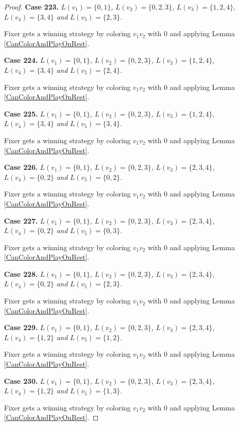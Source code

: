 \documentclass[12pt]{amsart}
\theoremstyle{plain}
\theoremstyle{definition}
\theoremstyle{remark}
\begin{document}
\begin{proof}
\noindent\textbf{Case 223.  }\textit{$L(v_1) = \{0, 1\}$, $L(v_2) = \{0, 2, 3\}$, $L(v_3) = \{1, 2, 4\}$, $L(v_4) = \{3, 4\}$ and $L(v_5) = \{2, 3\}$.}

Fixer gets a winning strategy by coloring $v_1v_2$ with $0$ and applying Lemma \ref{CanColorAndPlayOnRest}.

\noindent\textbf{Case 224.  }\textit{$L(v_1) = \{0, 1\}$, $L(v_2) = \{0, 2, 3\}$, $L(v_3) = \{1, 2, 4\}$, $L(v_4) = \{3, 4\}$ and $L(v_5) = \{2, 4\}$.}

Fixer gets a winning strategy by coloring $v_1v_2$ with $0$ and applying Lemma \ref{CanColorAndPlayOnRest}.

\noindent\textbf{Case 225.  }\textit{$L(v_1) = \{0, 1\}$, $L(v_2) = \{0, 2, 3\}$, $L(v_3) = \{1, 2, 4\}$, $L(v_4) = \{3, 4\}$ and $L(v_5) = \{3, 4\}$.}

Fixer gets a winning strategy by coloring $v_1v_2$ with $0$ and applying Lemma \ref{CanColorAndPlayOnRest}.

\noindent\textbf{Case 226.  }\textit{$L(v_1) = \{0, 1\}$, $L(v_2) = \{0, 2, 3\}$, $L(v_3) = \{2, 3, 4\}$, $L(v_4) = \{0, 2\}$ and $L(v_5) = \{0, 2\}$.}

Fixer gets a winning strategy by coloring $v_1v_2$ with $0$ and applying Lemma \ref{CanColorAndPlayOnRest}.

\noindent\textbf{Case 227.  }\textit{$L(v_1) = \{0, 1\}$, $L(v_2) = \{0, 2, 3\}$, $L(v_3) = \{2, 3, 4\}$, $L(v_4) = \{0, 2\}$ and $L(v_5) = \{0, 3\}$.}

Fixer gets a winning strategy by coloring $v_1v_2$ with $0$ and applying Lemma \ref{CanColorAndPlayOnRest}.

\noindent\textbf{Case 228.  }\textit{$L(v_1) = \{0, 1\}$, $L(v_2) = \{0, 2, 3\}$, $L(v_3) = \{2, 3, 4\}$, $L(v_4) = \{0, 2\}$ and $L(v_5) = \{2, 3\}$.}

Fixer gets a winning strategy by coloring $v_1v_2$ with $0$ and applying Lemma \ref{CanColorAndPlayOnRest}.

\noindent\textbf{Case 229.  }\textit{$L(v_1) = \{0, 1\}$, $L(v_2) = \{0, 2, 3\}$, $L(v_3) = \{2, 3, 4\}$, $L(v_4) = \{1, 2\}$ and $L(v_5) = \{1, 2\}$.}

Fixer gets a winning strategy by coloring $v_1v_2$ with $0$ and applying Lemma \ref{CanColorAndPlayOnRest}.

\noindent\textbf{Case 230.  }\textit{$L(v_1) = \{0, 1\}$, $L(v_2) = \{0, 2, 3\}$, $L(v_3) = \{2, 3, 4\}$, $L(v_4) = \{1, 2\}$ and $L(v_5) = \{1, 3\}$.}

Fixer gets a winning strategy by coloring $v_1v_2$ with $0$ and applying Lemma \ref{CanColorAndPlayOnRest}.


\end{proof}
\end{document}
